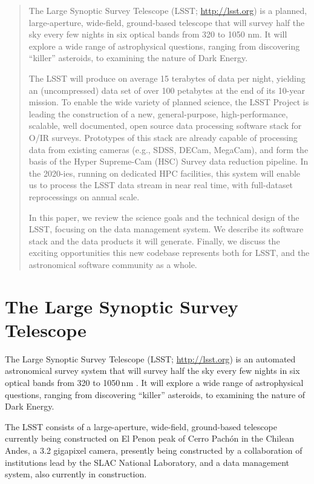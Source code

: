 \documentclass[11pt,twoside]{article}
\begin{document}
\begin{abstract}

The Large Synoptic Survey Telescope (LSST; \url{http://lsst.org}) is a planned,
large-aperture, wide-field, ground-based telescope that will survey half the
sky every few nights in six optical bands from 320 to 1050 nm.  It will
explore a wide range of astrophysical questions, ranging from discovering
``killer'' asteroids, to examining the nature of Dark Energy.

The LSST will produce on average 15 terabytes of data per night, yielding an
(uncompressed) data set of over 100 petabytes at the end of its 10-year
mission.  To enable the wide variety of planned science, the LSST Project is
leading the construction of a new, general-purpose, high-performance,
scalable, well documented, open source data processing software stack for
O/IR surveys.  Prototypes of this stack are already capable of processing
data from existing cameras (e.g., SDSS, DECam, MegaCam), and form the basis
of the Hyper Supreme-Cam (HSC) Survey data reduction pipeline.  In the
2020-ies, running on dedicated HPC facilities, this system will enable us to
process the LSST data stream in near real time, with full-dataset
reprocessings on annual scale.

In this paper, we review the science goals and the technical design of the
LSST, focusing on the data management system. We describe its software
stack and the data products it will generate. Finally, we discuss the
exciting opportunities this new codebase represents both for LSST,
and the astronomical software community as a whole.

\end{abstract}

\section{ The Large Synoptic Survey Telescope }

The Large Synoptic Survey Telescope (LSST; \url{http://lsst.org}) is an
automated astronomical survey system that will survey half the
sky every few nights in six optical bands from 320 to 1050\,nm \citep{2008arXiv0805.2366I}. It
will explore a wide range of astrophysical questions, ranging from discovering
``killer'' asteroids, to examining the nature of Dark Energy.

The LSST consists of a large-aperture, wide-field, ground-based telescope
currently being constructed on El Penon peak of Cerro Pach\'{o}n in the Chilean
Andes, a 3.2 gigapixel camera, presently being constructed by a collaboration
of institutions lead by the SLAC National Laboratory, and a data management
system, also currently in construction.
\end{document}
